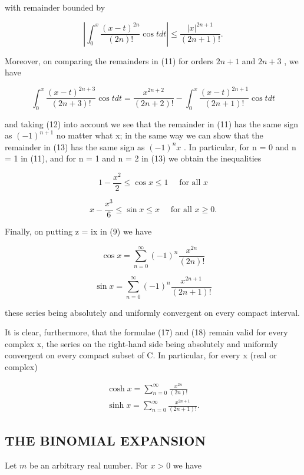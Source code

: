 with remainder bounded by

\[
\left| \int_ {0} ^ {x} \frac {(x - t) ^ {2 n}}{(2 n) !} \cos t d t \right| \leqslant \frac {| x | ^ {2 n + 1}}{(2 n + 1) !}.\tag{14}
\]

Moreover, on comparing the remainders in (11) for orders \(2n + 1\) and \(2n + 3\) , we have

\[
\int_ {0} ^ {x} \frac {(x - t) ^ {2 n + 3}}{(2 n + 3) !} \cos t d t = \frac {x ^ {2 n + 2}}{(2 n + 2) !} - \int_ {0} ^ {x} \frac {(x - t) ^ {2 n + 1}}{(2 n + 1) !} \cos t d t
\]

and taking (12) into account we see that the remainder in (11) has the same sign as \((-1)^{n+1}\) no matter what x; in the same way we can show that the remainder in (13) has the same sign as \((-1)^{n}x\) . In particular, for n = 0 and n = 1 in (11), and for n = 1 and n = 2 in (13) we obtain the inequalities

\[
1 - \frac {x ^ {2}}{2} \leqslant \cos x \leqslant 1 \quad \text { for   all } x\tag{15}
\]

\[
x - \frac {x ^ {3}}{6} \leqslant \sin x \leqslant x \quad \text { for   all } x \geqslant 0.\tag{16}
\]

Finally, on putting z = ix in (9) we have

\[
\cos x = \sum_ {n = 0} ^ {\infty} (- 1) ^ {n} \frac {x ^ {2 n}}{(2 n) !}\tag{17}
\]

\[
\sin x = \sum_ {n = 0} ^ {\infty} (- 1) ^ {n} \frac {x ^ {2 n + 1}}{(2 n + 1) !}\tag{18}
\]

these series being absolutely and uniformly convergent on every compact interval.

It is clear, furthermore, that the formulae (17) and (18) remain valid for every complex x, the series on the right-hand side being absolutely and uniformly convergent on every compact subset of C. In particular, for every x (real or complex)

\[
\begin{array}{l} \cosh x = \sum_ {n = 0} ^ {\infty} \frac {x ^ {2 n}}{(2 n) !} \\ \sinh x = \sum_ {n = 0} ^ {\infty} \frac {x ^ {2 n + 1}}{(2 n + 1) !}. \end{array}
\]

\subsection{THE BINOMIAL EXPANSION}

Let \(m\) be an arbitrary real number. For \(x > 0\) we have

